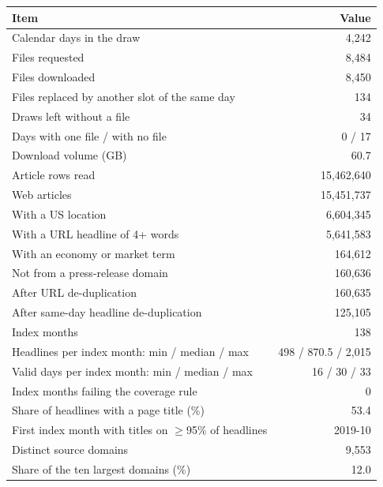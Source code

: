 \begin{tabular}{lr}
\toprule
Item & Value \\
\midrule
Calendar days in the draw & 4{,}242 \\
Files requested & 8{,}484 \\
Files downloaded & 8{,}450 \\
Files replaced by another slot of the same day & 134 \\
Draws left without a file & 34 \\
Days with one file / with no file & 0 / 17 \\
Download volume (GB) & 60.7 \\
\midrule
Article rows read & 15{,}462{,}640 \\
Web articles & 15{,}451{,}737 \\
With a US location & 6{,}604{,}345 \\
With a URL headline of 4+ words & 5{,}641{,}583 \\
With an economy or market term & 164{,}612 \\
Not from a press-release domain & 160{,}636 \\
After URL de-duplication & 160{,}635 \\
After same-day headline de-duplication & 125{,}105 \\
\midrule
Index months & 138 \\
Headlines per index month: min / median / max & 498 / 870.5 / 2{,}015 \\
Valid days per index month: min / median / max & 16 / 30 / 33 \\
Index months failing the coverage rule & 0 \\
Share of headlines with a page title (\%) & 53.4 \\
First index month with titles on $\geq$95\% of headlines & 2019-10 \\
Distinct source domains & 9{,}553 \\
Share of the ten largest domains (\%) & 12.0 \\
\bottomrule
\end{tabular}
